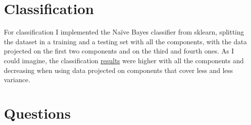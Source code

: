 \documentclass[11pt]{article}
\begin{document}
\section{Classification}\label{classification}

For classification I implemented the Naïve Bayes classifier from
sklearn, splitting the dataset in a training and a testing set with all
the components, with the data projected on the first two components and
on the third and fourth ones. As I could imagine, the classification
\hyperlink{classifier}{results} were higher with all the components and
decreasing when using data projected on components that cover less and
less variance.

\section{Questions }\label{questions}
\end{document}
